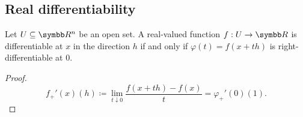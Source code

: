 \subsection{Real differentiability}\label{subsec:real_differentiability}

\begin{Proposition}\label{thm:real_valued_differentiability}
  Let \( U \subseteq \BR^n \) be an open set. A real-valued function \( f: U \to \BR \) is differentiable at \( x \) in the direction \( h \) if and only if \( \varphi(t) = f(x + th) \) is right-differentiable at \( 0 \).
\end{Proposition}
\begin{proof}
  \begin{equation*}
    f_+'(x)(h) \coloneqq \lim_{t \downarrow 0} \frac {f(x + th) - f(x)} t = \varphi_+'(0)(1).
  \end{equation*}
\end{proof}

